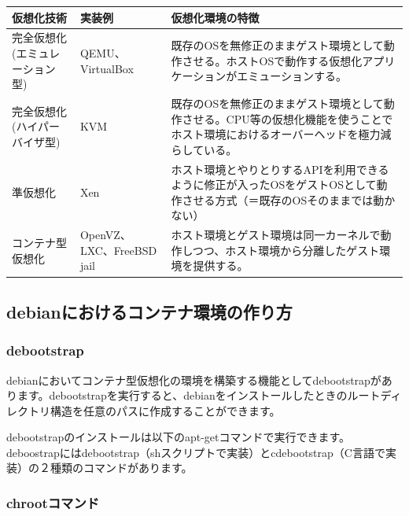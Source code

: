 \documentclass[mingoth,a4paper]{jsarticle}
\begin{document}
\begin{table}[hb]
  \begin{tabular}{|l|p{10em}|p{20em}|} \hline
    仮想化技術 & 実装例 & 仮想化環境の特徴 \\ \hline
    完全仮想化(エミュレーション型) & QEMU、VirtualBox & 既存のOSを無修正のままゲスト環境として動作させる。ホストOSで動作する仮想化アプリケーションがエミューションする。 \\ \hline
    完全仮想化(ハイパーバイザ型) & KVM & 既存のOSを無修正のままゲスト環境として動作させる。CPU等の仮想化機能を使うことでホスト環境におけるオーバーヘッドを極力減らしている。 \\ \hline
    準仮想化 & Xen & ホスト環境とやりとりするAPIを利用できるように修正が入ったOSをゲストOSとして動作させる方式（＝既存のOSそのままでは動かない） \\ \hline
    コンテナ型仮想化 & OpenVZ、LXC、FreeBSD jail & ホスト環境とゲスト環境は同一カーネルで動作しつつ、ホスト環境から分離したゲスト環境を提供する。  \\ \hline
  \end{tabular}
\end{table}

\subsection{debianにおけるコンテナ環境の作り方}

\subsubsection{debootstrap}
debianにおいてコンテナ型仮想化の環境を構築する機能としてdebootstrapがあります。debootstrapを実行すると、debianをインストールしたときのルートディレクトリ構造を任意のパスに作成することができます。

debootstrapのインストールは以下のapt-getコマンドで実行できます。deboostrapにはdebootstrap（shスクリプトで実装）とcdebootstrap（C言語で実装）の２種類のコマンドがあります。


\subsubsection{chrootコマンド}
\end{document}
